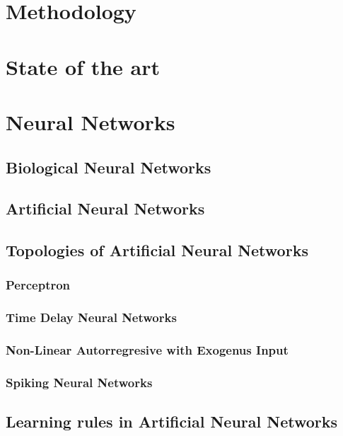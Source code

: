 \documentclass[a4paper,11pt,english]{report} %
\begin{document}
\chapter{Methodology}

\chapter{State of the art}


\chapter{Neural Networks}

\section{Biological Neural Networks}

\section{Artificial Neural Networks}

\section{Topologies of Artificial Neural Networks}
	\subsection{Perceptron}
	
	\subsection{Time Delay Neural Networks}
	
	\subsection{Non-Linear Autorregresive with Exogenus Input}
	
	\subsection{Spiking Neural Networks}
	
\section{Learning rules in Artificial Neural Networks}

\end{document}
